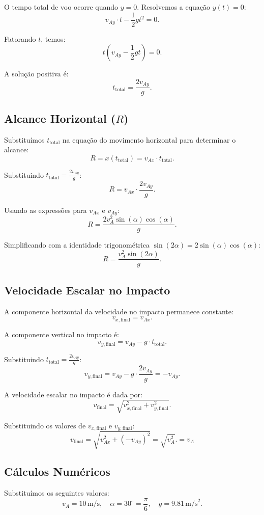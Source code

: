 O tempo total de voo ocorre quando \(y = 0\). Resolvemos a equação \(y(t) = 0\):
\[
v_{Ay} \cdot t - \frac{1}{2} g t^2 = 0.
\]

Fatorando \(t\), temos:
\[
t \left( v_{Ay} - \frac{1}{2} g t \right) = 0.
\]

A solução positiva é:
\[
t_{\text{total}} = \frac{2 v_{Ay}}{g}.
\]

\subsection*{Alcance Horizontal (\(R\))}
Substituímos \(t_{\text{total}}\) na equação do movimento horizontal para determinar o alcance:
\[
R = x(t_{\text{total}}) = v_{Ax} \cdot t_{\text{total}}.
\]

Substituindo \(t_{\text{total}} = \frac{2 v_{Ay}}{g}\):
\[
R = v_{Ax} \cdot \frac{2 v_{Ay}}{g}.
\]

Usando as expressões para \(v_{Ax}\) e \(v_{Ay}\):
\[
R = \frac{2 v_A^2 \sin(\alpha) \cos(\alpha)}{g}.
\]

Simplificando com a identidade trigonométrica \(\sin(2\alpha) = 2 \sin(\alpha) \cos(\alpha)\):
\[
R = \frac{v_A^2 \sin(2\alpha)}{g}.
\]

\subsection*{Velocidade Escalar no Impacto}
A componente horizontal da velocidade no impacto permanece constante:
\[
v_{x,\text{final}} = v_{Ax}.
\]

A componente vertical no impacto é:
\[
v_{y,\text{final}} = v_{Ay} - g \cdot t_{\text{total}}.
\]

Substituindo \(t_{\text{total}} = \frac{2 v_{Ay}}{g}\):
\[
v_{y,\text{final}} = v_{Ay} - g \cdot \frac{2 v_{Ay}}{g} = -v_{Ay}.
\]

A velocidade escalar no impacto é dada por:
\[
v_{\text{final}} = \sqrt{v_{x,\text{final}}^2 + v_{y,\text{final}}^2}.
\]

Substituindo os valores de \(v_{x,\text{final}}\) e \(v_{y,\text{final}}\):
\[
v_{\text{final}} = \sqrt{v_{Ax}^2 + (-v_{Ay})^2} = \sqrt{v_A^2}. = v_A
\]

\subsection*{Cálculos Numéricos}
Substituímos os seguintes valores:
\[
v_A = 10 \, \text{m/s}, \quad \alpha = 30^\circ = \frac{\pi}{6}, \quad g = 9.81 \, \text{m/s}^2.
\]

